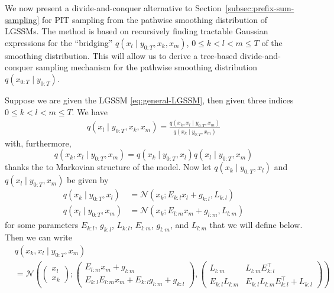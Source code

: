 We now present a divide-and-conquer alternative to Section~\ref{subsec:prefix-sum-sampling} for PIT sampling from the pathwise smoothing distribution of LGSSMs. The method is based on recursively finding tractable Gaussian expressions for the ``bridging'' $q(x_l \mid y_{0:T}, x_k, x_m)$, $0 \leq k < l < m \leq T$ of the smoothing distribution. This will allow us to derive a tree-based divide-and-conquer sampling mechanism for the pathwise smoothing distribution $q(x_{0:T} \mid y_{0:T})$.

Suppose we are given the LGSSM \eqref{eq:general-LGSSM}, then given three indices $0 \leq k < l < m \leq T$. We have
\begin{equation}
    \begin{split}
        q(x_l \mid y_{0:T}, x_k, x_m)
        = \frac{q(x_k, x_l \mid y_{0:T}, x_m)}
        {q(x_k \mid y_{0:T}, x_m)}
    \end{split}
\end{equation}
with, furthermore,
\begin{equation}
    q(x_k, x_l \mid y_{0:T}, x_m) = q(x_k \mid y_{0:T}, x_l) q(x_l \mid y_{0:T}, x_m)
\end{equation}
thanks the to Markovian structure of the model.
Now let $q(x_k \mid y_{0:T}, x_l)$ and $q(x_l \mid y_{0:T}, x_m)$ be given by
\begin{equation}
    \begin{split}
        q(x_k \mid y_{0:T}, x_l) &= \mathcal{N}(x_k; E_{k:l} x_l + g_{k:l}, L_{k:l})\\
        q(x_l \mid y_{0:T}, x_m) &= \mathcal{N}(x_k; E_{l:m} x_m + g_{l:m}, L_{l:m})
    \end{split}
\end{equation}
for some parameters $E_{k:l}$, $g_{k:l}$, $L_{k:l}$, $E_{l:m}$, $g_{l:m}$, and $L_{l:m}$ that we will define below. Then we can write
\begin{equation}
    \begin{split}
        &q(x_k, x_l \mid y_{0:T}, x_m)\\
        &= \mathcal{N}\left( \begin{pmatrix}
                                 x_l \\ x_k
        \end{pmatrix} ;
        \begin{pmatrix}
            E_{l:m} x_{m} + g_{l:m} \\
            E_{k:l} E_{l:m} x_{m} + E_{k:l} g_{l:m} + g_{k:l}
        \end{pmatrix},
        \begin{pmatrix}
            L_{l:m}         & L_{l:m} E_{k:l}^\top                   \\
            E_{k:l} L_{l:m} & E_{k:l} L_{l:m} E_{k:l}^\top + L_{k:l}
        \end{pmatrix} \right)
    \end{split}
\end{equation}
